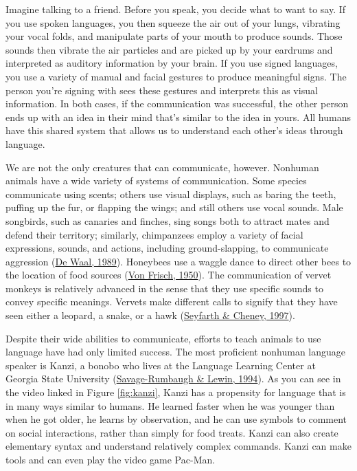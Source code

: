 \documentclass[
]{krantz}
\begin{document}
Imagine talking to a friend. Before you speak, you decide what to want to say. If you use spoken languages, you then squeeze the air out of your lungs, vibrating your vocal folds, and manipulate parts of your mouth to produce sounds. Those sounds then vibrate the air particles and are picked up by your eardrums and interpreted as auditory information by your brain. If you use signed languages, you use a variety of manual and facial gestures to produce meaningful signs. The person you're signing with sees these gestures and interprets this as visual information. In both cases, if the communication was successful, the other person ends up with an idea in their mind that's similar to the idea in yours. All humans have this shared system that allows us to understand each other's ideas through language.

We are not the only creatures that can communicate, however. Nonhuman animals have a wide variety of systems of communication. Some species communicate using scents; others use visual displays, such as baring the teeth, puffing up the fur, or flapping the wings; and still others use vocal sounds. Male songbirds, such as canaries and finches, sing songs both to attract mates and defend their territory; similarly, chimpanzees employ a variety of facial expressions, sounds, and actions, including ground-slapping, to communicate aggression (\protect\hyperlink{ref-deWaal1989}{De Waal, 1989}). Honeybees use a waggle dance to direct other bees to the location of food sources (\protect\hyperlink{ref-vonFrisch1956}{Von Frisch, 1950}). The communication of vervet monkeys is relatively advanced in the sense that they use specific sounds to convey specific meanings. Vervets make different calls to signify that they have seen either a leopard, a snake, or a hawk (\protect\hyperlink{ref-Seyfarth1997}{Seyfarth \& Cheney, 1997}).

Despite their wide abilities to communicate, efforts to teach animals to use language have had only limited success. The most proficient nonhuman language speaker is Kanzi, a bonobo who lives at the Language Learning Center at Georgia State University (\protect\hyperlink{ref-Savage-Rumbaugh1994}{Savage-Rumbaugh \& Lewin, 1994}). As you can see in the video linked in Figure \ref{fig:kanzi}, Kanzi has a propensity for language that is in many ways similar to humans. He learned faster when he was younger than when he got older, he learns by observation, and he can use symbols to comment on social interactions, rather than simply for food treats. Kanzi can also create elementary syntax and understand relatively complex commands. Kanzi can make tools and can even play the video game Pac-Man.
\end{document}
